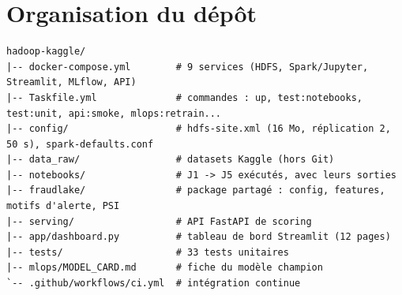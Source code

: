 \documentclass[11pt,a4paper]{article}
\begin{document}
\section{Organisation du dépôt}
\begin{lstlisting}
hadoop-kaggle/
|-- docker-compose.yml        # 9 services (HDFS, Spark/Jupyter, Streamlit, MLflow, API)
|-- Taskfile.yml              # commandes : up, test:notebooks, test:unit, api:smoke, mlops:retrain...
|-- config/                   # hdfs-site.xml (16 Mo, réplication 2, 50 s), spark-defaults.conf
|-- data_raw/                 # datasets Kaggle (hors Git)
|-- notebooks/                # J1 -> J5 exécutés, avec leurs sorties
|-- fraudlake/                # package partagé : config, features, motifs d'alerte, PSI
|-- serving/                  # API FastAPI de scoring
|-- app/dashboard.py          # tableau de bord Streamlit (12 pages)
|-- tests/                    # 33 tests unitaires
|-- mlops/MODEL_CARD.md       # fiche du modèle champion
`-- .github/workflows/ci.yml  # intégration continue
\end{lstlisting}
\end{document}
